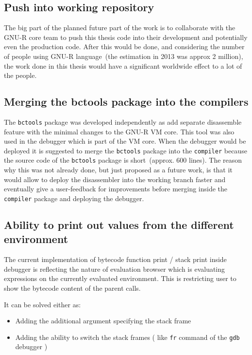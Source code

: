 \documentclass[thesis=M,english]{FITthesis}[2018/10/20]
\newcommand{\code}[1]{\texttt{#1}}
\begin{document}
{\subsection{Push into working repository}

The big part of the planned future part of the work is to collaborate with the GNU-R core team to push this thesis code into their development and potentially even the production code. After this would be done, and considering the number of people using GNU-R language~(the estimation in 2013 was approx 2 million), the work done in this thesis would have a significant worldwide effect to a lot of the people.


\subsection{Merging the bctools package into the compilers}

The \code{bctools} package was developed independently as add separate disassemble feature with the minimal changes to the GNU-R VM core. This tool was also used in the debugger which is part of the VM core. When the debugger would be deployed it is suggested to merge the \code{bctools} package into the \code{compiler} because the source code of the \code{bctools} package is short~(approx. 600 lines). The reason why this was not already done, but just proposed as a future work, is that it would allow to deploy the disassembler into the working branch faster and eventually give a user-feedback for improvements before merging inside the \code{compiler} package and deploying the debugger.

\subsection{Ability to print out values from the different environment}

The current implementation of bytecode function print / stack print inside debugger is reflecting the nature of evaluation browser which is evaluating expressions on the currently evaluated environment. This is restricting user to show the bytecode content of the parent calls. 

It can be solved either as:
\begin{itemize}
	\item Adding the additional argument specifying the stack frame 
	\item Adding the ability to switch the stack frames ( like \code{fr} command of the \code{gdb} debugger )
\end{itemize}

}
\end{document}
